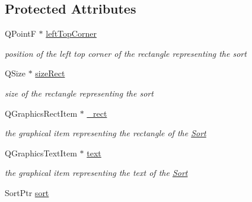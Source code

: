 \subsection*{Protected Attributes}
\begin{DoxyCompactItemize}
\item 
\hypertarget{classGSort_a15b874bf036f285664508a85602aa037}{Q\+Point\+F $\ast$ \hyperlink{classGSort_a15b874bf036f285664508a85602aa037}{left\+Top\+Corner}}\label{classGSort_a15b874bf036f285664508a85602aa037}

\begin{DoxyCompactList}\small\item\em position of the left top corner of the rectangle representing the sort \end{DoxyCompactList}\item 
\hypertarget{classGSort_a621da5d2a45083b02a35bce999022079}{Q\+Size $\ast$ \hyperlink{classGSort_a621da5d2a45083b02a35bce999022079}{size\+Rect}}\label{classGSort_a621da5d2a45083b02a35bce999022079}

\begin{DoxyCompactList}\small\item\em size of the rectangle representing the sort \end{DoxyCompactList}\item 
\hypertarget{classGSort_aa5979b4b0c0e9efbccce0de13ded38d8}{Q\+Graphics\+Rect\+Item $\ast$ \hyperlink{classGSort_aa5979b4b0c0e9efbccce0de13ded38d8}{\+\_\+rect}}\label{classGSort_aa5979b4b0c0e9efbccce0de13ded38d8}

\begin{DoxyCompactList}\small\item\em the graphical item representing the rectangle of the \hyperlink{classSort}{Sort} \end{DoxyCompactList}\item 
\hypertarget{classGSort_a17c4f8eafc9402f5393e69e614f5429a}{Q\+Graphics\+Text\+Item $\ast$ \hyperlink{classGSort_a17c4f8eafc9402f5393e69e614f5429a}{text}}\label{classGSort_a17c4f8eafc9402f5393e69e614f5429a}

\begin{DoxyCompactList}\small\item\em the graphical item representing the text of the \hyperlink{classSort}{Sort} \end{DoxyCompactList}\item 
\hypertarget{classGSort_a8dea499c0b3fa30f9e9558a165a52030}{Sort\+Ptr \hyperlink{classGSort_a8dea499c0b3fa30f9e9558a165a52030}{sort}}\label{classGSort_a8dea499c0b3fa30f9e9558a165a52030}


\end{DoxyCompactItemize}
